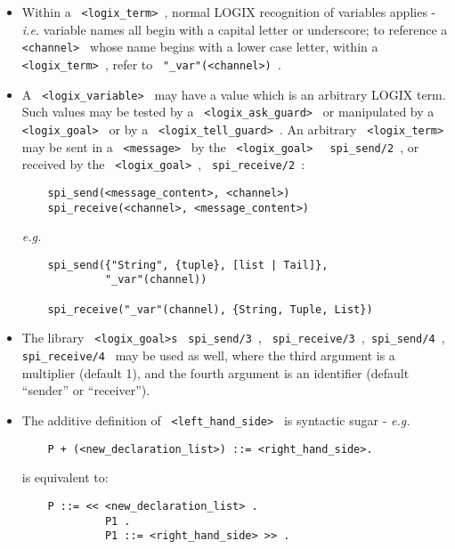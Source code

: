 \begin{itemize}
\item
Within a \verb+ <logix_term> +, normal LOGIX recognition of variables
applies - {\em i.e.} variable names all begin with a capital letter
or underscore; to reference a \verb+ <channel> + whose name begins
with a lower case letter, within a \verb+ <logix_term> +, refer to
\verb+ "_var"(<channel>) +.


\item
A \verb+ <logix_variable> + may have a value which is an arbitrary LOGIX
term.
Such values may be tested by a \verb+ <logix_ask_guard> + or manipulated
by a \verb+ <logix_goal> + or by a \verb+ <logix_tell_guard> +.  An
arbitrary  \verb+ <logix_term> + may be sent in a \verb+ <message> + by
the \verb+ <logix_goal> + \verb+ spi_send/2 +, or received by the
\verb+ <logix_goal> +, \verb+ spi_receive/2 +:

\begin{verbatim}
    spi_send(<message_content>, <channel>)
    spi_receive(<channel>, <message_content>)
\end{verbatim}

\newpage
\noindent
{\em e.g.}

\begin{verbatim}
    spi_send({"String", {tuple}, [list | Tail]},
             "_var"(channel))

    spi_receive("_var"(channel), {String, Tuple, List})
\end{verbatim}

\item
The library \verb+ <logix_goal>s+ \verb+ spi_send/3 +,
\verb+ spi_receive/3 +,\linebreak \verb+ spi_send/4 +, \verb+ spi_receive/4 + may be
used as well, where the third argument is a multiplier (default 1), and
the fourth argument is an identifier (default ``sender'' or ``receiver'').

\item
The additive definition of \verb+ <left_hand_side> + is syntactic sugar
- {\em e.g.}

\begin{verbatim}
    P + (<new_declaration_list>) ::= <right_hand_side>.
\end{verbatim}

\noindent
is equivalent to:

\begin{verbatim}
    P ::= << <new_declaration_list> .
             P1 .
             P1 ::= <right_hand_side> >> .
\end{verbatim}


\end{itemize}

